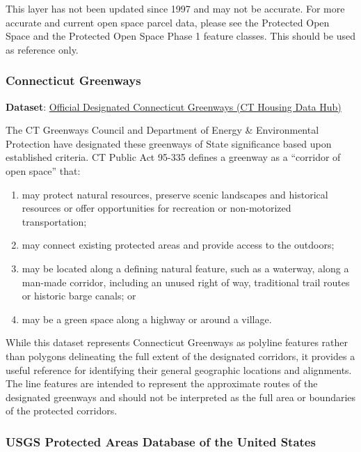 \documentclass[
  letterpaper,
  DIV=11,
  numbers=noendperiod]{scrreprt}
\providecommand{\tightlist}{%
  \setlength{\itemsep}{0pt}\setlength{\parskip}{0pt}}
\begin{document}
This layer has not been updated since 1997 and may not be accurate. For
more accurate and current open space parcel data, please see the
Protected Open Space and the Protected Open Space Phase 1 feature
classes. This should be used as reference only.

\subsubsection{Connecticut Greenways}\label{sec-greenways}

\textbf{Dataset}:
\href{https://housingmaps.ct.gov/datasets/CTDEEP::official-designated-connecticut-greenways/about}{Official
Designated Connecticut Greenways (CT Housing Data Hub)}

The CT Greenways Council and Department of Energy \& Environmental
Protection have designated these greenways of State significance based
upon established criteria. CT Public Act 95-335 defines a greenway as a
``corridor of open space'' that:~

\begin{enumerate}
\def\labelenumi{\arabic{enumi}.}
\tightlist
\item
  may protect natural resources, preserve scenic landscapes and
  historical resources or offer opportunities for recreation or
  non-motorized transportation;
\item
  may connect existing protected areas and provide access to the
  outdoors;
\item
  may be located along a defining natural feature, such as a waterway,
  along a man-made corridor, including an unused right of way,
  traditional trail routes or historic barge canals; or~
\item
  may be a green space along a highway or around a village.
\end{enumerate}

While this dataset represents Connecticut Greenways as polyline features
rather than polygons delineating the full extent of the designated
corridors, it provides a useful reference for identifying their general
geographic locations and alignments. The line features are intended to
represent the approximate routes of the designated greenways and should
not be interpreted as the full area or boundaries of the protected
corridors.

\subsubsection{USGS Protected Areas Database of the United
States}\label{sec-usgs-protected-areas-database-of-the-united-states}
\end{document}
